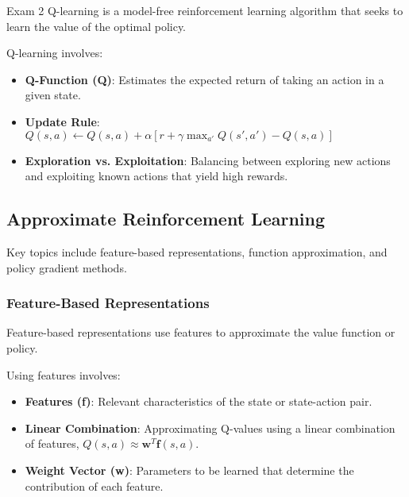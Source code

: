 \begin{examnotes}{Exam 2}
    Q-learning is a model-free reinforcement learning algorithm that seeks to learn the value of the optimal policy.
    
    \begin{highlight}
        Q-learning involves:
        \begin{itemize}
            \item \textbf{Q-Function (Q)}: Estimates the expected return of taking an action in a given state.
            \item \textbf{Update Rule}: $Q(s, a) \leftarrow Q(s, a) + \alpha [r + \gamma \max_{a'} Q(s', a') - Q(s, a)]$
            \item \textbf{Exploration vs. Exploitation}: Balancing between exploring new actions and exploiting known actions that yield high rewards.
        \end{itemize}
    \end{highlight}
    
    \subsection*{Approximate Reinforcement Learning}
    
    Key topics include feature-based representations, function approximation, and policy gradient methods.
    
    \subsubsection*{Feature-Based Representations}
    
    Feature-based representations use features to approximate the value function or policy.
    
    \begin{highlight}
        Using features involves:
        \begin{itemize}
            \item \textbf{Features (f)}: Relevant characteristics of the state or state-action pair.
            \item \textbf{Linear Combination}: Approximating Q-values using a linear combination of features, $Q(s, a) \approx \mathbf{w}^T \mathbf{f}(s, a)$.
            \item \textbf{Weight Vector (w)}: Parameters to be learned that determine the contribution of each feature.
        \end{itemize}
    \end{highlight}
    

\end{examnotes}
